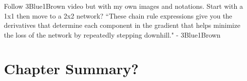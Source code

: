 Follow 3Blue1Brown video but with my own images and notations. Start with a 1x1 then move to a 2x2 network?
``These chain rule expressions give you the derivatives that determine each component in the gradient that helps minimize the loss of the network by repeatedly stepping downhill." - 3Blue1Brown

\section{Chapter Summary?}